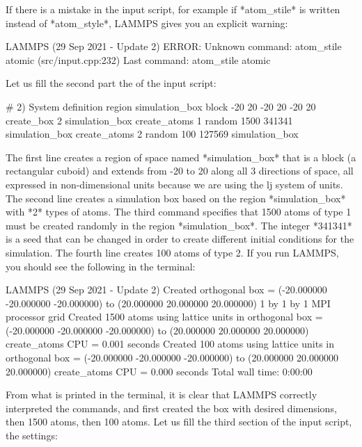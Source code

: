 If there is a mistake in the input script, for example if
*atom_stile* is written instead of *atom_style*, LAMMPS
gives you an explicit warning:

\begin{lcverbatim}
LAMMPS (29 Sep 2021 - Update 2)
ERROR: Unknown command: atom_stile  atomic (src/input.cpp:232)
Last command: atom_stile atomic
\end{lcverbatim}

Let us fill the second part the of the input script:

\begin{lcverbatim}
# 2) System definition
region simulation_box block -20 20 -20 20 -20 20
create_box 2 simulation_box
create_atoms 1 random 1500 341341 simulation_box
create_atoms 2 random 100 127569 simulation_box
\end{lcverbatim}

The first line creates a region of space
named *simulation_box* that is a block (a rectangular cuboid) and
extends from -20 to 20 along all 3 directions of space, all expressed in
non-dimensional units because we are using the lj system
of units. The second line creates a simulation box based on
the region *simulation_box* with *2* types of atoms. The third
command specifies that 1500 atoms of type 1 must be created
randomly in the region *simulation_box*. The integer *341341* is a
seed that can be changed in order to create different
initial conditions for the simulation. The fourth line
creates 100 atoms of type 2.
If you run LAMMPS, you should see the following in the
terminal:

\begin{lcverbatim}
LAMMPS (29 Sep 2021 - Update 2)
Created orthogonal box = (-20.000000 -20.000000 -20.000000) to (20.000000 20.000000 20.000000)
1 by 1 by 1 MPI processor grid
Created 1500 atoms
using lattice units in orthogonal box = (-20.000000 -20.000000 -20.000000) to (20.000000 20.000000 20.000000)
create_atoms CPU = 0.001 seconds
Created 100 atoms
using lattice units in orthogonal box = (-20.000000 -20.000000 -20.000000) to (20.000000 20.000000 20.000000)
create_atoms CPU = 0.000 seconds
Total wall time: 0:00:00
\end{lcverbatim}

From what is printed in the terminal, it is clear that
LAMMPS correctly interpreted the commands, and first created
the box with desired dimensions, then 1500 atoms, then 100
atoms.
Let us fill the third section of the input script, the settings:

